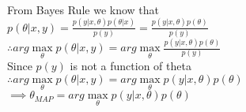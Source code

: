 \begin{answer}\\
From Bayes Rule we know that\\
$p(\theta |x,y)=\frac{p(y | x,\theta)p(\theta|x)}{p(y)}=\frac{p(y|x,\theta)p(\theta)}{p(y)}$\\
$\therefore arg \max\limits_{\theta} p(\theta|x,y)=arg \max\limits_{\theta}\frac{p(y|x,\theta)p(\theta)}{p(y)}$\\
Since $p(y)$ is not a function of theta\\
$\therefore arg \max\limits_{\theta} p(\theta|x,y)=arg \max\limits_{\theta} p(y|x,\theta)p(\theta)$\\
$\implies \theta_{MAP}=arg \max\limits_{\theta} p(y|x,\theta)p(\theta)$\\
\end{answer}
